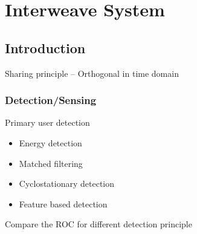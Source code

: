 \chapter{Interweave System}
\label{chap:IS}

\section{Introduction}
Sharing principle -- Orthogonal in time domain 

\subsection{Detection/Sensing}
Primary user detection \\ 
\begin{itemize}
\item Energy detection
\item Matched filtering
\item Cyclostationary detection
\item Feature based detection
\end{itemize}
Compare the \ac{ROC} for different detection principle 



